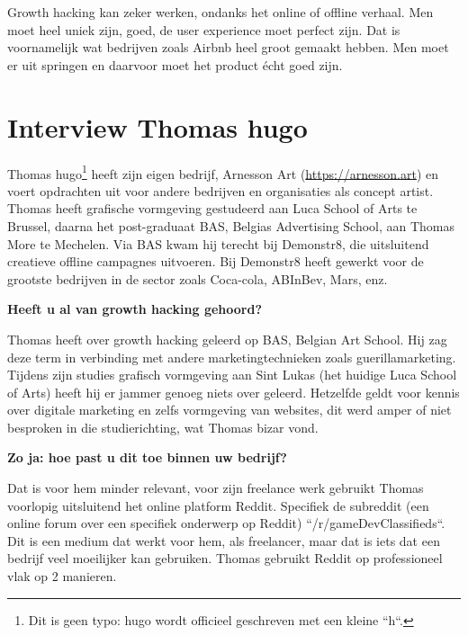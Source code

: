 Growth hacking kan zeker werken, ondanks het online of offline verhaal. Men moet heel uniek zijn, goed, de user experience moet perfect zijn. Dat is voornamelijk wat bedrijven zoals Airbnb heel groot gemaakt hebben. Men moet er uit springen en daarvoor moet het product écht goed zijn.

\section{Interview Thomas hugo}
\label{sec:interview-thomas-hugo}

Thomas hugo\footnote{Dit is geen typo: hugo wordt officieel geschreven met een kleine ``h``. } heeft zijn eigen bedrijf, Arnesson Art (\href{https://arnesson.art/}{https://arnesson.art}) en voert opdrachten uit voor andere bedrijven en organisaties als concept artist. Thomas heeft grafische vormgeving gestudeerd aan Luca School of Arts te Brussel, daarna het post-graduaat BAS, Belgias Advertising School, aan Thomas More te Mechelen. Via BAS kwam hij terecht bij Demonstr8, die uitsluitend creatieve offline campagnes uitvoeren. Bij Demonstr8 heeft gewerkt voor de grootste bedrijven in de sector zoals Coca-cola, ABInBev, Mars, enz.

\textbf{Heeft u al van growth hacking gehoord?}
	
Thomas heeft over growth hacking geleerd op BAS, Belgian Art School. Hij zag deze term in verbinding met andere marketingtechnieken zoals guerillamarketing. Tijdens zijn studies grafisch vormgeving aan Sint Lukas (het huidige Luca School of Arts) heeft hij er jammer genoeg niets over geleerd. Hetzelfde geldt voor kennis over digitale marketing en zelfs vormgeving van websites, dit werd amper of niet besproken in die studierichting, wat Thomas bizar vond.
	
\textbf{Zo ja: hoe past u dit toe binnen uw bedrijf?}
	
Dat is voor hem minder relevant, voor zijn freelance werk gebruikt Thomas voorlopig uitsluitend het online platform Reddit. Specifiek de subreddit (een online forum over een specifiek onderwerp op Reddit) ``/r/gameDevClassifieds``. Dit is een medium dat werkt voor hem, als freelancer, maar dat is iets dat een bedrijf veel moeilijker kan gebruiken. Thomas gebruikt Reddit op professioneel vlak op 2 manieren. 
	
